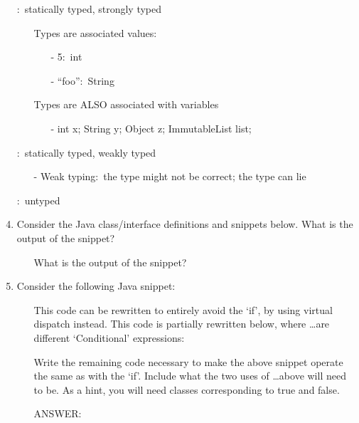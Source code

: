 \documentclass[12pt,a4paper]{article}
\begin{document}
\begin{enumerate}
    \item[] :\ statically typed, strongly typed
    \begin{itemize}
      \item[] Types are associated values:\
      \begin{itemize}
        \item[-] 5:\ int
        \item[-] ``foo'':\ String
      \end{itemize}
      \item[] Types are ALSO associated with variables
      \begin{itemize}
        \item[-] int x; String y; Object z; ImmutableList list;
      \end{itemize}
    \end{itemize} 
    \item[] :\ statically typed, weakly typed
    \begin{itemize}
      \item[-] Weak typing:\ the type might not be correct; the type can lie 
    \end{itemize} 
    \item[] :\ untyped
    \clearpage
    \item Consider the Java class/interface definitions and snippets below. What is the output of the snippet? 
    \begin{itemize}
      \item[]  
      \item[] What is the output of the snippet? 
      \item[] 
    \end{itemize}
    \clearpage
    \item Consider the following Java snippet:\
    \begin{itemize}
      \item[] 
      \item[] This code can be rewritten to entirely avoid the `if', by using virtual dispatch instead. 
      This code is partially rewritten below, where \dots are different `Conditional' expressions:\
      \item[] 
      \item[] Write the remaining code necessary to make the above snippet operate the same as with the
      `if'. Include what the two uses of \dots above will need to be. As a hint, you will need classes 
      corresponding to true and false.
      \item[] ANSWER:\
      \item[]   
    \end{itemize}
  \end{enumerate}
\end{document}
